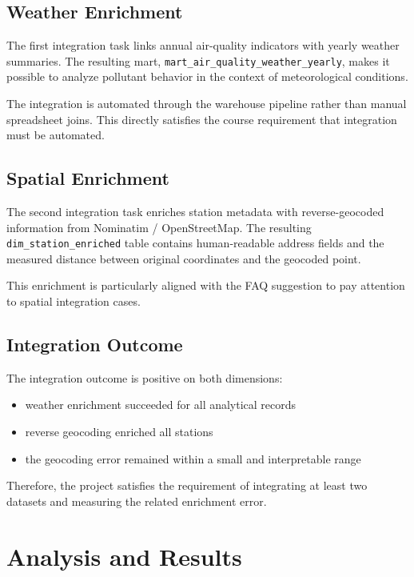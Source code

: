 \documentclass[11pt,a4paper]{article}
\begin{document}
\subsection{Weather Enrichment}

The first integration task links annual air-quality indicators with yearly weather summaries. The resulting mart, \texttt{mart\_air\_quality\_weather\_yearly}, makes it possible to analyze pollutant behavior in the context of meteorological conditions.

The integration is automated through the warehouse pipeline rather than manual spreadsheet joins. This directly satisfies the course requirement that integration must be automated.

\subsection{Spatial Enrichment}

The second integration task enriches station metadata with reverse-geocoded information from Nominatim / OpenStreetMap. The resulting \texttt{dim\_station\_enriched} table contains human-readable address fields and the measured distance between original coordinates and the geocoded point.

This enrichment is particularly aligned with the FAQ suggestion to pay attention to spatial integration cases.

\subsection{Integration Outcome}

The integration outcome is positive on both dimensions:

\begin{itemize}
  \item weather enrichment succeeded for all analytical records
  \item reverse geocoding enriched all stations
  \item the geocoding error remained within a small and interpretable range
\end{itemize}

Therefore, the project satisfies the requirement of integrating at least two datasets and measuring the related enrichment error.

\section{Analysis and Results}
\end{document}
